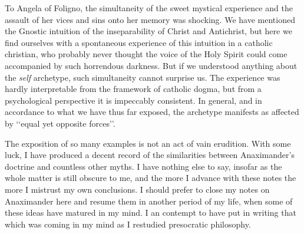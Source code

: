 \documentclass[a4paper]{article}
\begin{document}
To Angela of Foligno, the simultaneity of the sweet mystical experience and the
assault of her vices and sins onto her memory was shocking. We have mentioned the
Gnostic intuition of the inseparability of Christ and Antichrist, but here we
find ourselves with a spontaneous experience of this intuition in a catholic
christian, who probably never thought the voice of the Holy Spirit could come
accompanied by such horrendous darkness. But if we understood anything about the
\textit{self} archetype, such simultaneity cannot surprise us. The experience
was hardly interpretable from the framework of catholic dogma, but from a
psychological perspective it is impeccably consistent. In general, and in
accordance to what we have thus far exposed, the archetype manifests as affected
by \lq\lq equal yet opposite forces\rq\rq.

The exposition of so many examples is not an act of vain erudition. With some
luck, I have produced a decent record of the similarities between Anaximander's
doctrine and countless other myths. I have nothing else to say, insofar as the
whole matter is still obscure to me, and the more I advance with these notes the
more I mistrust my own conclusions. I should prefer to close my notes on
Anaximander here and resume them in another period of my life, when some of
these ideas have matured in my mind. I an contempt to have put in writing that
which was coming in my mind as I restudied presocratic philosophy. 
\end{document}
